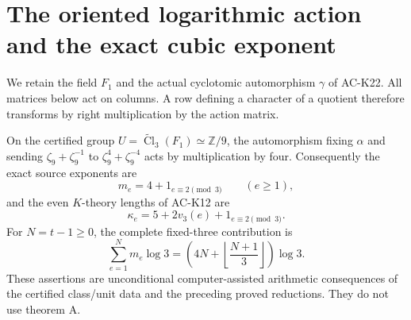 \section{The oriented logarithmic action and the exact cubic exponent}
\label{sec:cubic-oriented-action}

We retain the field $F_1$ and the actual cyclotomic automorphism
$\gamma$ of AC-K22.  All matrices below act on columns.
A row defining a character of a quotient therefore transforms
by right multiplication by the action matrix.

\begin{theorem}
\label{AC-K23}
On the certified group
$U=\widetilde{\operatorname{Cl}}_3(F_1)\simeq\mathbb Z/9$,
the automorphism fixing $\alpha$ and sending
$\zeta_9+\zeta_9^{-1}$ to $\zeta_9^4+\zeta_9^{-4}$
acts by multiplication by four.
Consequently the exact source exponents are
\[
       \boxed{\displaystyle m_e=4+1_{e\equiv2\pmod3}}
                     \qquad(e\geq1),                 \tag{K23.1}
\]
and the even $K$-theory lengths of AC-K12 are
\[
       \kappa_e=5+2v_3(e)+1_{e\equiv2\pmod3}.         \tag{K23.2}
\]
For $N=t-1\geq0$, the complete fixed-three contribution is
\[
       \sum_{e=1}^{N}m_e\log3
          =\left(4N+\left\lfloor\frac{N+1}{3}\right\rfloor\right)\log3.
                                                        \tag{K23.3}
\]
These assertions are unconditional computer-assisted arithmetic
consequences of the certified class/unit data and the preceding
proved reductions.  They do not use theorem A.
\end{theorem}
